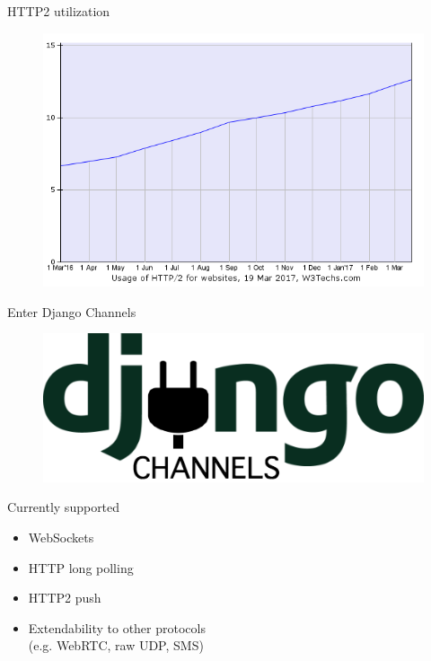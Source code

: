 \documentclass{beamer}
\begin{document}
\begin{frame}{HTTP2 utilization}
	\begin{center}
		\begin{figure}
			\includegraphics[scale=0.45]{ce-http2.png}
		\end{figure}
	\end{center}
\end{frame}

\begin{frame}{Enter Django Channels}
	\begin{center}
		\begin{figure}
			\includegraphics[scale=0.6]{django-channels-logo.png}
		\end{figure}
	\end{center}
\end{frame}

\begin{frame}{Currently supported}
	\begin{adjustwidth}{2em}{2.5em}
	\begin{itemize}
		\item WebSockets
		\item HTTP long polling
		\item HTTP2 push
		\item Extendability to other protocols\\ (e.g. WebRTC, raw UDP, SMS)
	\end{itemize}
	\end{adjustwidth}
\end{frame}
\end{document}
